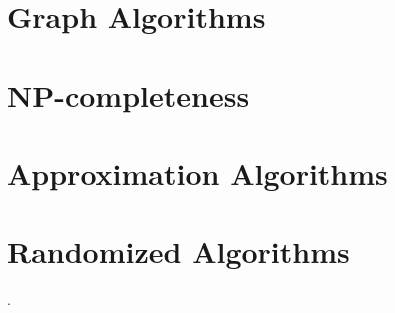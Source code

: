 \documentclass[en,hazy,blue,screen,14pt]{elegantnote}
\begin{document}
\part{Graph Algorithms}

\part{NP-completeness}

\part{Approximation Algorithms}

\part{Randomized Algorithms}.
\end{document}
